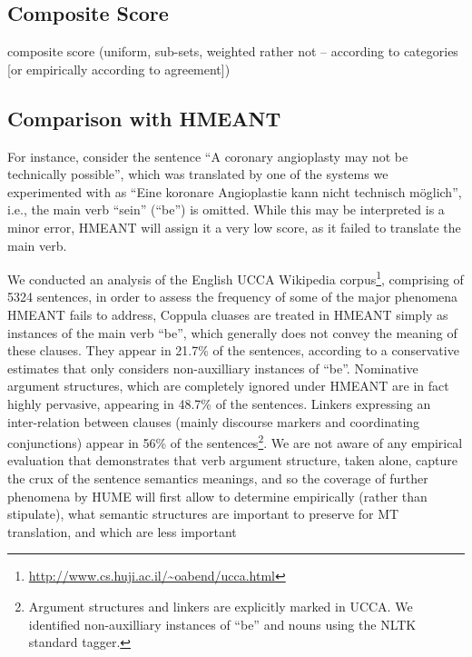 \documentclass[11pt]{article}
\begin{document}
\subsection{Composite Score}\label{sec:score}

composite score (uniform, sub-sets, weighted rather not -- according to categories [or empirically according to agreement])


\subsection{Comparison with HMEANT}\label{sec:hmeant_comp}

For instance, consider the sentence ``A coronary angioplasty may not be technically possible'',
which was translated by one of the systems we experimented with as
``Eine koronare Angioplastie kann nicht technisch m{\"o}glich'', i.e., the main verb ``sein'' (``be'') is omitted.
While this may be interpreted is a minor error, HMEANT will assign it a very low score, as it failed to
translate the main verb. 

We conducted an analysis of the English UCCA Wikipedia
corpus\footnote{\url{http://www.cs.huji.ac.il/~oabend/ucca.html}}, comprising
of 5324 sentences,
in order to assess the frequency of some of the major phenomena HMEANT fails to address,
Coppula cluases are treated in HMEANT simply as instances of the main verb ``be'', which
generally does not convey the meaning of these clauses. They appear in 21.7\% of the sentences,
according to a conservative estimates that only considers non-auxilliary instances of ``be''.
Nominative argument structures, which are completely ignored under HMEANT are in fact highly
pervasive, appearing in 48.7\% of the sentences. Linkers expressing an inter-relation between
clauses (mainly discourse markers and coordinating conjunctions) appear in 56\% of the
sentences\footnote{Argument structures and linkers are explicitly marked in UCCA. We identified
  non-auxilliary instances of ``be'' and nouns using the NLTK standard tagger.}.
We are not aware of any empirical evaluation that demonstrates that verb argument structure,
taken alone, capture the crux of the sentence semantics meanings, and so the coverage of
further phenomena by HUME will first allow to determine empirically
(rather than stipulate), what semantic structures are important
to preserve for MT translation, and which are less important




\end{document}
